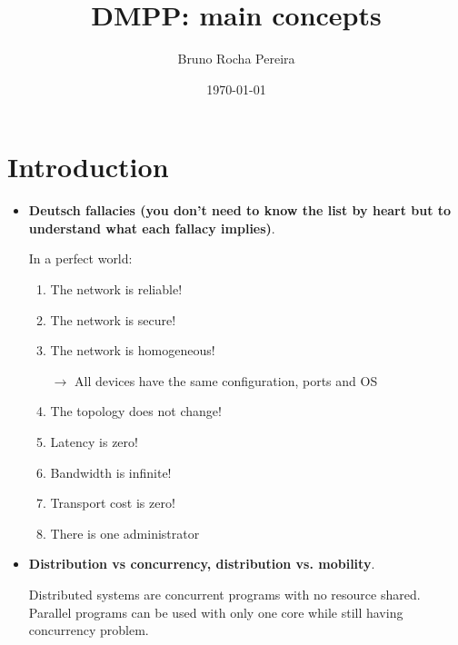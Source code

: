 \documentclass[a4paper]{report}
\title{DMPP: main concepts}
\author{Bruno Rocha Pereira}
\date{\today}
\begin{document}
\maketitle


\chapter{Introduction}
\begin{itemize}
  \item \textbf{Deutsch fallacies (you don’t need to know the list by heart but to understand what
  each fallacy implies)}.
  
  In a perfect world:
  \begin{enumerate}
	\item The network is reliable!
    \item The network is secure!
    \item The network is homogeneous!
    
	$\rightarrow $ All devices have the same configuration, ports and OS
    \item The topology does not change!
    \item Latency is zero!
    \item Bandwidth is infinite!
    \item Transport cost is zero!
    \item There is one administrator
\end{enumerate}
  \item \textbf{Distribution vs concurrency, distribution vs. mobility}.

  Distributed systems are concurrent programs with no resource shared. Parallel programs can be used with only one core while still having  concurrency problem.


\end{itemize}
\end{document}
